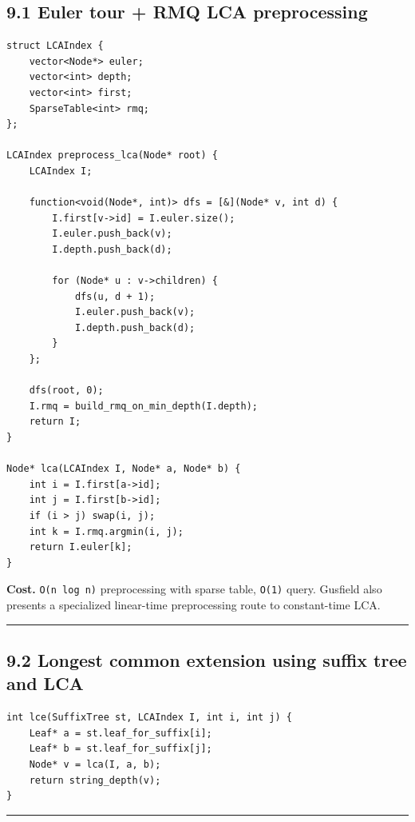 \documentclass[11pt]{article}
\begin{document}
\subsection{9.1 Euler tour + RMQ LCA preprocessing}\label{euler-tour-rmq-lca-preprocessing}

\begin{verbatim}
struct LCAIndex {
    vector<Node*> euler;
    vector<int> depth;
    vector<int> first;
    SparseTable<int> rmq;
};

LCAIndex preprocess_lca(Node* root) {
    LCAIndex I;

    function<void(Node*, int)> dfs = [&](Node* v, int d) {
        I.first[v->id] = I.euler.size();
        I.euler.push_back(v);
        I.depth.push_back(d);

        for (Node* u : v->children) {
            dfs(u, d + 1);
            I.euler.push_back(v);
            I.depth.push_back(d);
        }
    };

    dfs(root, 0);
    I.rmq = build_rmq_on_min_depth(I.depth);
    return I;
}

Node* lca(LCAIndex I, Node* a, Node* b) {
    int i = I.first[a->id];
    int j = I.first[b->id];
    if (i > j) swap(i, j);
    int k = I.rmq.argmin(i, j);
    return I.euler[k];
}
\end{verbatim}

\textbf{Cost.} \texttt{O(n log n)} preprocessing with sparse table, \texttt{O(1)} query. Gusfield also presents a specialized linear-time preprocessing route to constant-time LCA.

\begin{center}\rule{0.5\linewidth}{0.5pt}\end{center}

\subsection{9.2 Longest common extension using suffix tree and LCA}\label{longest-common-extension-using-suffix-tree-and-lca}

\begin{verbatim}
int lce(SuffixTree st, LCAIndex I, int i, int j) {
    Leaf* a = st.leaf_for_suffix[i];
    Leaf* b = st.leaf_for_suffix[j];
    Node* v = lca(I, a, b);
    return string_depth(v);
}
\end{verbatim}

\begin{center}\rule{0.5\linewidth}{0.5pt}\end{center}
\end{document}

